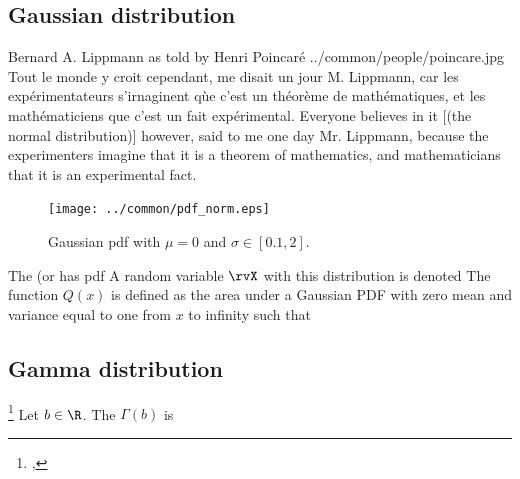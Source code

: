 \subsection{Gaussian distribution}
\qboxnpqt
  {Bernard A. Lippmann as told by Henri Poincar\'e
   
   
   \footnotemark
  }
  {../common/people/poincare.jpg}
  {Tout le monde y croit cependant, me disait un jour M. Lippmann,
   car les exp\'erimentateurs s'irnaginent q\`ue c'est un th\'eor\`eme
   de math\'ematiques, et les math\'ematiciens que c'est un fait
   exp\'erimental.}
  {Everyone believes in it [(the normal distribution)] however,
   said to me one day Mr. Lippmann, because the experimenters imagine that
   it is a theorem of mathematics,
   and mathematicians that it is an experimental fact.}



\begin{figure}[ht]
   \begin{center}
   \texttt{[image: ../common/pdf\_norm.eps]}
   \end{center}
\caption{
  Gaussian pdf with $\mu=0$ and $\sigma\in[0.1,2]$.
  \label{fig:pdf_norm}
  }
\end{figure}

\begin{definition}
The  (or  has pdf
A random variable $\rvX$ with this distribution is denoted
The function $Q(x)$ is defined as the area under a
Gaussian PDF with zero mean and variance equal to one
from $x$ to infinity such that
\end{definition}

\subsection{Gamma distribution}
\begin{definition}
\label{def:Gamma(b)}
\footnote{
  ,
  }
Let $b\in\R$. The  $\Gamma(b)$ is
\end{definition}

